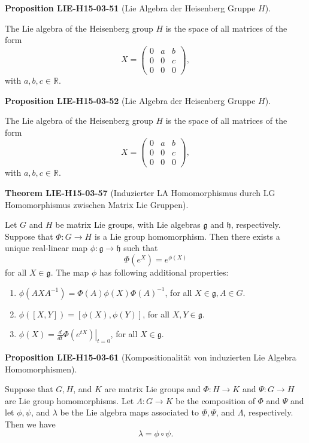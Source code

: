 \documentclass[10pt, letterpaper]{article}
\newcommand{\CustomHeading}[3]{%
  \par\medskip\noindent%
  \textbf{#1 #2} \textnormal{(#3)}.\enskip%
}
\newenvironment{PROP}[2]{\CustomHeading{Proposition}{#1}{#2}}{}
\newenvironment{THEO}[2]{\CustomHeading{Theorem}{#1}{#2}}{}
\begin{document}
\begin{PROP}{LIE-H15-03-51}{Lie Algebra der Heisenberg Gruppe $H$}
The Lie algebra of the Heisenberg group $H$ is the space of all matrices of the form
$$
X=\left(\begin{array}{lll}
0 & a & b \\
0 & 0 & c \\
0 & 0 & 0
\end{array}\right),
$$
with $a, b, c \in \mathbb{R}$.
\end{PROP}

\begin{PROP}{LIE-H15-03-52}{Lie Algebra der Heisenberg Gruppe $H$}
The Lie algebra of the Heisenberg group $H$ is the space of all matrices of the form
$$
X=\left(\begin{array}{lll}
0 & a & b \\
0 & 0 & c \\
0 & 0 & 0
\end{array}\right),
$$
with $a, b, c \in \mathbb{R}$.
\end{PROP}

\begin{THEO}{LIE-H15-03-57}{Induzierter LA Homomorphismus durch LG Homomorphismus zwischen Matrix Lie Gruppen}
Let $G$ and $H$ be matrix Lie groups, with Lie algebras $\mathfrak{g}$ and $\mathfrak{h}$, respectively. Suppose that $\Phi: G \rightarrow H$ is a Lie group homomorphism. Then there exists a unique real-linear map $\phi: \mathfrak{g} \rightarrow \mathfrak{h}$ such that
$$
\Phi\left(e^{X}\right)=e^{\phi(X)}
$$
for all $X \in \mathfrak{g}$. The map $\phi$ has following additional properties:
\begin{enumerate}
  \item $\phi\left(A X A^{-1}\right)=\Phi(A) \phi(X) \Phi(A)^{-1}$, for all $X \in \mathfrak{g}, A \in G$.
  \item $\phi([X, Y])=[\phi(X), \phi(Y)]$, for all $X, Y \in \mathfrak{g}$.
  \item $\phi(X)=\left.\frac{d}{d t} \Phi\left(e^{t X}\right)\right|_{t=0}$, for all $X \in \mathfrak{g}$.
\end{enumerate}
\end{THEO}

\begin{PROP}{LIE-H15-03-61}{Kompositionalität von induzierten Lie Algebra Homomorphismen}
Suppose that $G, H$, and $K$ are matrix Lie groups and $\Phi: H \rightarrow K$ and $\Psi: G \rightarrow H$ are Lie group homomorphisms. Let $\Lambda: G \rightarrow K$ be the composition of $\Phi$ and $\Psi$ and let $\phi, \psi$, and $\lambda$ be the Lie algebra maps associated to $\Phi, \Psi$, and $\Lambda$, respectively. Then we have
$$
\lambda=\phi \circ \psi .
$$
\end{PROP}
\end{document}
